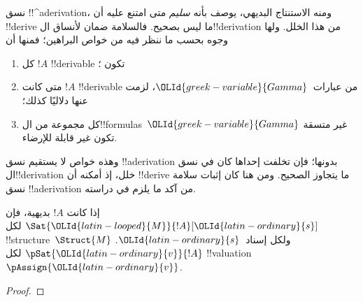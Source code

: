 \documentclass[../../../include/open-logic-section]{subfiles}
\begin{document}
      {}
      {}


\begin{explain}
نسق !!^a{derivation}، ومنه الاستنتاج البديهي، يوصف بأنه \emph{سليم}
متى امتنع عليه أن !!{derive} ما ليس بصحيح. فالسلامة ضمان لأنساق
ال!!{derivation} من هذا الخلل. ولها وجوه بحسب ما ننظر فيه من خواص
البراهين؛ فمنها أن
\begin{enumerate}
\item كل $!A$ !!{derivable} تكون ؛
\item متى كانت $!A$ !!{derivable} من عبارات~$\OLId{greek-variable}{Gamma}$، لزمت عنها
  دلاليًا كذلك؛
\item كل مجموعة من ال!!{formula}s~$\OLId{greek-variable}{Gamma}$ غير متسقة تكون غير قابلة
  للإرضاء.
\end{enumerate}
وهذه خواص لا يستقيم نسق !!a{derivation} بدونها؛ فإن تخلفت إحداها
كان في نسق ال!!{derivation} خلل، إذ أمكنه أن !!{derive} ما يتجاوز
الصحيح. ومن هنا كان إثبات سلامة نسق !!a{derivation} من آكد ما يلزم
في دراسته.
\end{explain}

\begin{prop}
  إذا كانت $!A$ بديهية، فإن
    {$\Sat{\OLId{latin-looped}{M}}{!A}[\OLId{latin-ordinary}{s}]$ لكل !!{structure}~$\Struct{M}$ ولكل إسناد~$\OLId{latin-ordinary}{s}$.}
    {$\pSat{\OLId{latin-ordinary}{v}}{!A}$ لكل !!{valuation}~$\pAssign{\OLId{latin-ordinary}{v}}$.}
\end{prop}

\begin{proof}
\end{proof}
\end{document}
